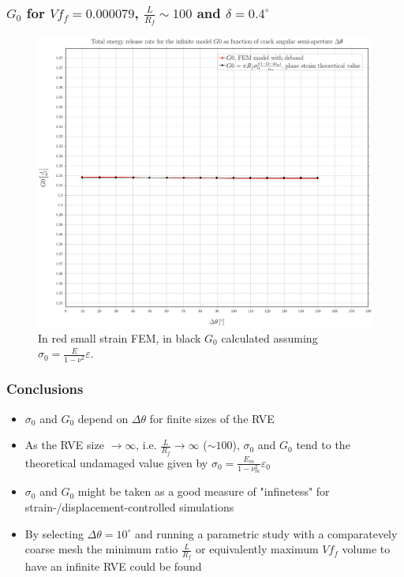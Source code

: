 \documentclass[first,firstsupp,lastsupp,handout,last,hyperref,table]{ETHclass}
\begin{document}
\begin{frame}
\frametitle{\small $G_{0}$ for $Vf_{f}=0.000079$, $\frac{L}{R_{f}}\sim100$ and $\delta=0.4^{\circ}$}
\vspace{-0.5cm}
\centering
\captionsetup[figure]{font=scriptsize,labelfont=scriptsize}
\begin{figure}[!h]
\centering
\includegraphics[height=0.7\textheight]{2017-06-16_AbqRunSummary_SingleFiberEqRfSmallStrain-D0-4_G0_Summary.pdf}
  \caption{\scriptsize In red small strain FEM, in black $G_{0}$ calculated assuming $\sigma_{0}=\frac{E}{1-\nu^{2}}\varepsilon$.}
  \label{fig:res1}
\end{figure}
\end{frame}

\begin{frame}
\frametitle{\small Conclusions}
\vspace{-0.5cm}
\centering
\begin{itemize}[label=]
\item $\sigma_{0}$ and $G_{0}$ depend on $\Delta\theta$ for finite sizes of the RVE
\item As the RVE size $\rightarrow\infty$, i.e. $\frac{L}{R_{f}}\rightarrow \infty$ ($\sim 100$), $\sigma_{0}$ and $G_{0}$ tend to the theoretical undamaged value given by $\sigma_{0}=\frac{E_{m}}{1-\nu_{m}^{2}}\varepsilon_{0}$
\item $\sigma_{0}$ and $G_{0}$ might be taken as a good measure of "infinetess" for strain-/displacement-controlled simulations
\item By selecting $\Delta\theta=10^{\circ}$ and running a parametric study with a comparatevely coarse mesh the minimum ratio  $\frac{L}{R_{f}}$ or equivalently maximum $Vf_{f}$ volume to have an infinite RVE could be found
\end{itemize}
\end{frame}
\end{document}
